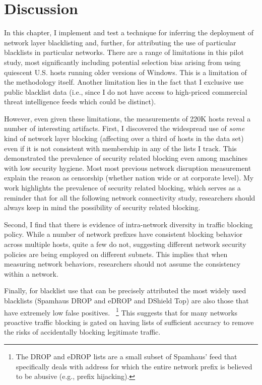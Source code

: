 \section{Discussion}

In this chapter, I implement and test a technique for inferring
the deployment of network layer blacklisting and, further, for
attributing the use of particular blacklists in particular networks.
There are a range of limitations in this pilot study, most
significantly including potential selection bias arising from using
quiescent U.S. hosts running older versions of Windows. This is a 
limitation of the methodology itself. 
Another limitation lies in the fact that I exclusive use public 
blacklist data (i.e., since I do not have access to high-priced 
commercial threat intelligence feeds which could be distinct).

However, even given these limitations, the measurements of
220K hosts reveal a number of interesting artifacts.  First, I
discovered the widespread use of \emph{some} kind of network layer
blocking (affecting over a third of hosts in the data set) even if it
is not consistent with membership in any of the lists I track.
This demonstrated the prevalence of security related blocking 
even among machines with low security hygiene. Most most previous 
network disruption measurement explain the reason as censorship 
(whether nation wide or at corporate level). My work highlights 
the prevalence of security related blocking, which serves as a
reminder that for all the following network connectivity study,
researchers should always keep in mind the possibility of security
related blocking.

Second, I find that there is evidence of intra-network diversity in
traffic blocking policy. While a number of network prefixes have
consistent blocking behavior across multiple hosts, quite a few do
not, suggesting different network security policies are being employed
on different subnets. This implies that when measuring network 
behaviors, researchers should not assume the consistency within a 
network.

Finally, for blacklist use that can be precisely attributed the 
most widely used blacklists (Spamhaus DROP and eDROP and DShield Top) 
are also those that have extremely low false positives.
~\footnote{The DROP and eDROP lists are a small subset
of Spamhaus' feed that specifically deals with address for which the
entire network prefix is believed to be abusive (e.g., prefix
hijacking).} This suggests that for many networks proactive traffic
blocking is gated on having lists of sufficient accuracy to remove
the risks of accidentally blocking legitimate traffic.

